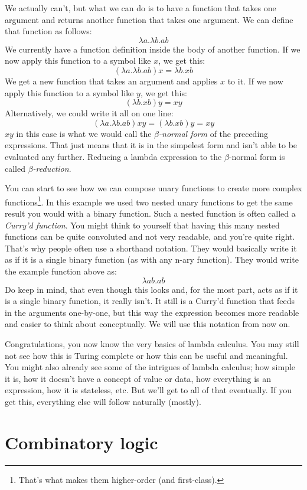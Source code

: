 \documentclass[11pt]{book}
\begin{document}
We actually can't, but what we can do is to have a function that takes one
argument and returns another function that takes one argument. We can define
that function as follows:
\[\lambda a.\lambda b.ab\]
We currently have a function definition inside the body of another function. If
we now apply this function to a symbol like \(x\), we get this:
\[(\lambda a.\lambda b.ab)x=\lambda b.xb\]
We get a new function that takes an argument and applies \(x\) to it. If we now
apply this function to a symbol like \(y\), we get this:
\[(\lambda b.xb)y=xy\]
Alternatively, we could write it all on one line:
\[(\lambda a.\lambda b.ab)xy=(\lambda b.xb)y=xy\]
\(xy\) in this case is what we would call the \emph{\(\beta\)-normal form} of
the preceding expressions. That just means that it is in the simpelest form and
isn't able to be evaluated any further. Reducing a lambda expression to the
\(\beta\)-normal form is called \emph{\(\beta\)-reduction}.

You can start to see how we can compose unary functions to create more complex
functions\footnote{That's what makes them higher-order (and first-class).}. In
this example we used two nested unary functions to get the same result you
would with a binary function. Such a nested function is often called a
\emph{Curry'd function}.
You might think to yourself that having this many nested functions can be quite
convoluted and not very readable, and you're quite right. That's why people
often use a shorthand notation. They would basically write it as if it is a
single binary function (as with any n-ary function). They would write the
example function above as:
\[\lambda ab.ab\]
Do keep in mind, that even though this looks and, for the most part, acts as if
it is a single binary function, it really isn't. It still is a Curry'd function
that feeds in the arguments one-by-one, but this way the expression becomes
more readable and easier to think about conceptually. We will use this notation
from now on.

Congratulations, you now know the very basics of lambda calculus. You may still
not see how this is Turing complete or how this can be useful and meaningful.
You might also already see some of the intrigues of lambda calculus; how simple
it is, how it doesn't have a concept of value or data, how everything is an
expression, how it is stateless, etc. But we'll get to all of that eventually.
If you get this, everything else will follow naturally (mostly).

\section{Combinatory logic}
\end{document}
